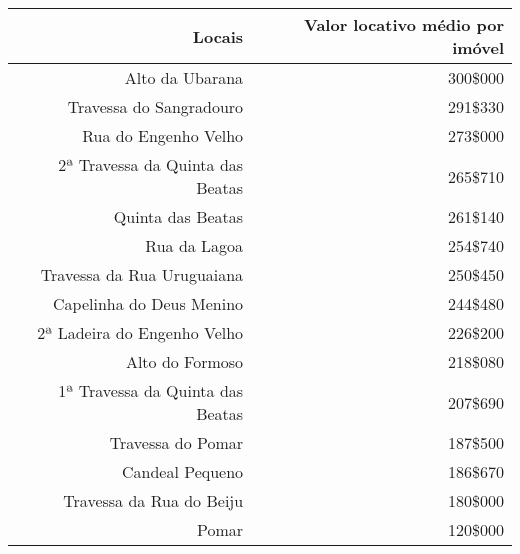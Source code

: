 \begin{table}[!htp]
{
\begin{tabular}{rr}
\hline
Locais	&Valor locativo médio por imóvel\\
\hline
\hline
Alto da Ubarana	&300\$000\\
Travessa do Sangradouro	&291\$330\\
Rua do Engenho Velho	&273\$000\\
2ª Travessa da Quinta das Beatas	&265\$710\\
Quinta das Beatas	&261\$140\\
Rua da Lagoa	&254\$740\\
Travessa da Rua Uruguaiana	&250\$450\\
Capelinha do Deus Menino	&244\$480\\
2ª Ladeira do Engenho Velho	&226\$200\\
Alto do Formoso	&218\$080\\
1ª Travessa da Quinta das Beatas	&207\$690\\
Travessa do Pomar	&187\$500\\
Candeal Pequeno	&186\$670\\
Travessa da Rua do Beiju	&180\$000\\
Pomar	&120\$000\\
\hline
\end{tabular}
}
{}
\end{table}